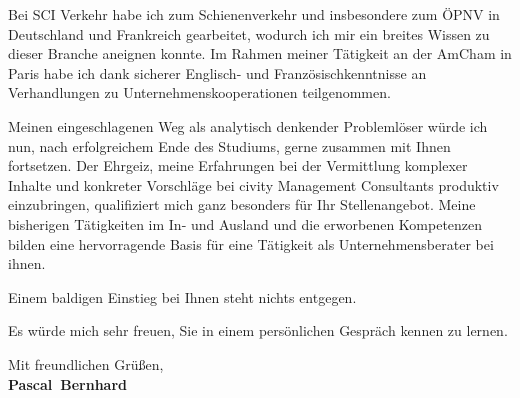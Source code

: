 \documentclass[11pt,a4paper]{article}
\def\firstname{Pascal}
\def\familyname{Bernhard}
\begin{document}
Bei SCI Verkehr habe ich zum Schienenverkehr und insbesondere zum ÖPNV in Deutschland und Frankreich gearbeitet, wodurch ich mir ein breites Wissen zu dieser Branche aneignen konnte. Im Rahmen meiner Tätigkeit an der AmCham in Paris habe ich dank sicherer Englisch- und Französischkenntnisse an Verhandlungen zu Unternehmenskooperationen teilgenommen. 


Meinen eingeschlagenen Weg als analytisch denkender Problemlöser würde ich nun, nach erfolgreichem Ende des Studiums, gerne zusammen mit Ihnen fortsetzen.
Der Ehrgeiz, meine Erfahrungen bei der Vermittlung komplexer Inhalte und konkreter Vorschläge bei civity Management Consultants produktiv einzubringen, qualifiziert mich ganz besonders für Ihr Stellenangebot. Meine bisherigen Tätigkeiten im In- und Ausland und die erworbenen Kompetenzen bilden eine hervorragende Basis für eine Tätigkeit als Unternehmensberater bei ihnen.


Einem baldigen Einstieg bei Ihnen steht nichts entgegen.


Es würde mich sehr freuen, Sie in einem persönlichen Gespräch kennen zu lernen.

  
Mit freundlichen Grüßen,\\[3em] %
%
{\bfseries \firstname~\familyname}\\
%
\end{document}
